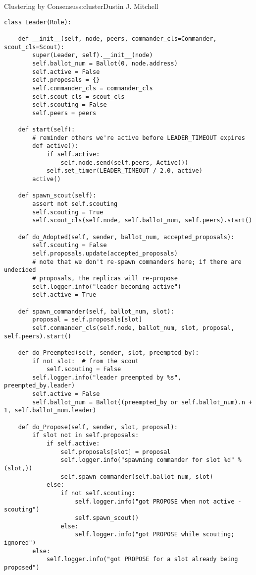 \begin{aosachapter}{Clustering by Consensus}{s:cluster}{Dustin J. Mitchell}
\begin{verbatim}
class Leader(Role):

    def __init__(self, node, peers, commander_cls=Commander, scout_cls=Scout):
        super(Leader, self).__init__(node)
        self.ballot_num = Ballot(0, node.address)
        self.active = False
        self.proposals = {}
        self.commander_cls = commander_cls
        self.scout_cls = scout_cls
        self.scouting = False
        self.peers = peers

    def start(self):
        # reminder others we're active before LEADER_TIMEOUT expires
        def active():
            if self.active:
                self.node.send(self.peers, Active())
            self.set_timer(LEADER_TIMEOUT / 2.0, active)
        active()

    def spawn_scout(self):
        assert not self.scouting
        self.scouting = True
        self.scout_cls(self.node, self.ballot_num, self.peers).start()

    def do_Adopted(self, sender, ballot_num, accepted_proposals):
        self.scouting = False
        self.proposals.update(accepted_proposals)
        # note that we don't re-spawn commanders here; if there are undecided
        # proposals, the replicas will re-propose
        self.logger.info("leader becoming active")
        self.active = True

    def spawn_commander(self, ballot_num, slot):
        proposal = self.proposals[slot]
        self.commander_cls(self.node, ballot_num, slot, proposal, self.peers).start()

    def do_Preempted(self, sender, slot, preempted_by):
        if not slot:  # from the scout
            self.scouting = False
        self.logger.info("leader preempted by %s", preempted_by.leader)
        self.active = False
        self.ballot_num = Ballot((preempted_by or self.ballot_num).n + 1, self.ballot_num.leader)

    def do_Propose(self, sender, slot, proposal):
        if slot not in self.proposals:
            if self.active:
                self.proposals[slot] = proposal
                self.logger.info("spawning commander for slot %d" % (slot,))
                self.spawn_commander(self.ballot_num, slot)
            else:
                if not self.scouting:
                    self.logger.info("got PROPOSE when not active - scouting")
                    self.spawn_scout()
                else:
                    self.logger.info("got PROPOSE while scouting; ignored")
        else:
            self.logger.info("got PROPOSE for a slot already being proposed")
    

\end{verbatim}
\end{aosachapter}

